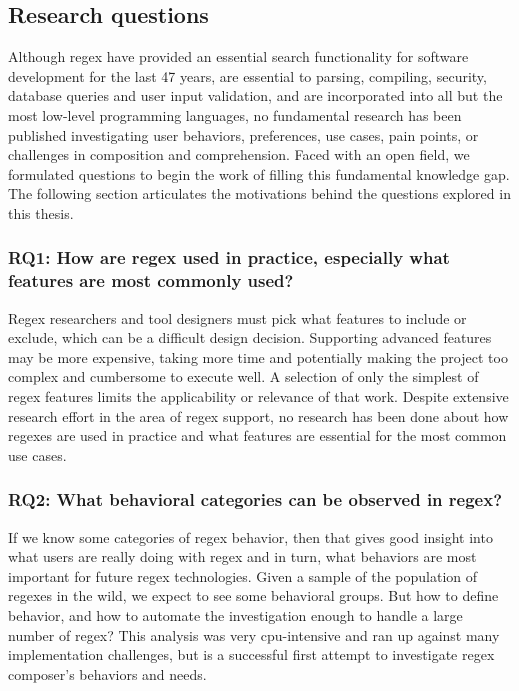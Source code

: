 \subsection{Research questions}

Although regex have provided an essential search functionality for software development for the last 47 years, are essential to parsing, compiling, security, database queries and user input validation, and are incorporated into all but the most low-level programming languages, no fundamental research has been published investigating user behaviors, preferences, use cases, pain points, or challenges in composition and comprehension.  Faced with an open field, we formulated  questions to begin the work of filling this fundamental knowledge gap.  The following section articulates the motivations behind the questions explored in this thesis.

\subsubsection{RQ1: How are regex used in practice, especially what features are most commonly used?}

Regex researchers and tool designers must pick what features to include or exclude, which  can be a difficult  design decision. Supporting advanced features may be more expensive, taking more time and potentially making the project too complex and cumbersome to execute well.  A selection of only the simplest of regex features limits the applicability or relevance of that work. Despite extensive research effort in the area of regex support,  no research has been done about how regexes are used in practice and what features are essential for the most common use cases.

\subsubsection{RQ2: What behavioral categories can be observed in regex?}
If we know some categories of regex behavior, then that gives good insight into what users are really doing with regex and in turn, what behaviors are most important for future regex technologies.  Given a sample of the population of regexes in the wild, we expect to see some behavioral groups.  But how to define behavior, and how to automate the investigation enough to handle a large number of regex?  This analysis was very cpu-intensive and ran up against many implementation challenges, but is a successful first attempt to investigate regex composer's behaviors and needs.

